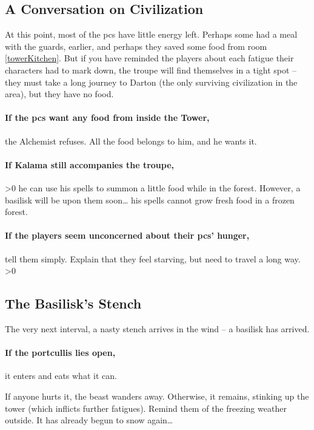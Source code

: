 \begin{multicols}{2}

\subsection{A Conversation on Civilization}

At this point, most of the \glspl{pc} have little energy left.
Perhaps some had a meal with the \glspl{guard}, earlier, and perhaps they saved some food from room \ref{towerKitchen}.
But if you have reminded the players about each \gls{fatigue} their characters had to mark down, the troupe will find themselves in a tight spot -- they must take a long journey to Darton (the only surviving civilization in the area), but they have no food.

\paragraph{If the \glspl{pc} want any food from inside the Tower,}
the Alchemist refuses.
All the food belongs to him, and he wants it.

\paragraph{If Kalama still accompanies the troupe,}
\ifnum\value{temperature}>0
  he can use his spells to summon a little food while in the forest.
  However, a basilisk will be upon them soon\ldots
\else%
  his spells cannot grow fresh food in a frozen forest.
\fi

\paragraph{If the players seem unconcerned about their \glspl{pc}' hunger,}
tell them simply.
Explain that they feel starving, but need to travel a long way.
\ifnum\value{temperature}>0%

\subsection{The Basilisk's Stench}

  The very next interval, a nasty stench arrives in the wind -- a basilisk has arrived.

  \paragraph{If the portcullis lies open,}
  it enters and eats what it can.

  If anyone hurts it, the beast wanders away.
  Otherwise, it remains, stinking up the tower (which inflicts further \glspl{fatigue}).
  \basilisk
\else
  Remind them of the freezing weather outside.
  It has already begun to snow again\ldots
\fi

\end{multicols}
